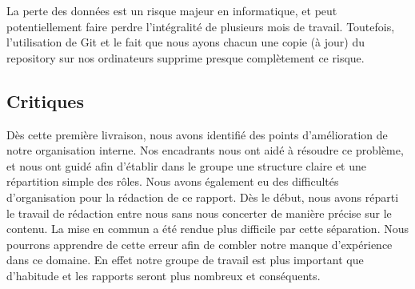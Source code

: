 	    La perte des données est un risque majeur en informatique, et peut potentiellement faire perdre l'intégralité de plusieurs mois de travail. Toutefois, l'utilisation de Git et le fait que nous ayons chacun une copie (à jour) du repository sur nos ordinateurs supprime presque complètement ce risque.

	\subsection{Critiques}
		Dès cette première livraison, nous avons identifié des points d'amélioration de notre organisation interne. Nos encadrants nous ont aidé à résoudre ce problème, et nous ont guidé afin d'établir dans le groupe une structure claire et une répartition simple des rôles.
		Nous avons également eu des difficultés d'organisation pour la rédaction de ce rapport. Dès le début, nous avons réparti le travail de rédaction entre nous sans nous concerter de manière précise sur le contenu. La mise en commun a été rendue plus difficile par cette séparation. Nous pourrons apprendre de cette erreur afin de combler notre manque d'expérience dans ce domaine. En effet notre groupe de travail est plus important que d'habitude et les rapports seront plus nombreux et conséquents.
